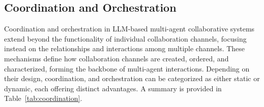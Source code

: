 \documentclass[acmsmall,nonacm]{acmart}
\begin{document}
    
    \subsection{Coordination and Orchestration}

        Coordination and orchestration in LLM-based multi-agent collaborative systems extend beyond the functionality of individual collaboration channels, focusing instead on the relationships and interactions among multiple channels. These mechanisms define how collaboration channels are created, ordered, and characterized, forming the backbone of multi-agent interactions. Depending on their design, coordination, and orchestration can be categorized as either static or dynamic, each offering distinct advantages. A summary is provided in Table~\ref{tab:coordination}.
\end{document}
